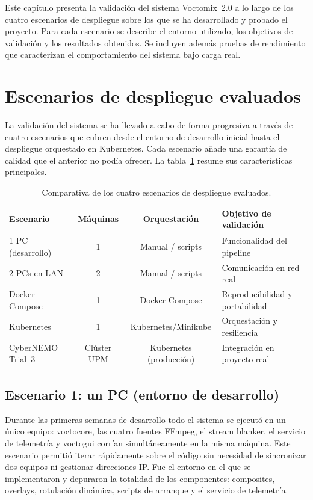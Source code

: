 Este capítulo presenta la validación del sistema Voctomix~2.0 a lo largo de los cuatro
escenarios de despliegue sobre los que se ha desarrollado y probado el proyecto.
Para cada escenario se describe el entorno utilizado, los objetivos de validación y
los resultados obtenidos. Se incluyen además pruebas de rendimiento que caracterizan
el comportamiento del sistema bajo carga real.

\section{Escenarios de despliegue evaluados}
\label{sec:escenarios}

La validación del sistema se ha llevado a cabo de forma progresiva a través de cuatro
escenarios que cubren desde el entorno de desarrollo inicial hasta el despliegue
orquestado en Kubernetes. Cada escenario añade una garantía de calidad que el anterior
no podía ofrecer. La tabla~\ref{tab:escenarios} resume sus características principales.

\begin{table}[H]
  \centering
  \caption{Comparativa de los cuatro escenarios de despliegue evaluados.}
  \label{tab:escenarios}
  \begin{tabular}{|l|c|c|l|}
    \hline
    \textbf{Escenario} & \textbf{Máquinas} & \textbf{Orquestación} & \textbf{Objetivo de validación} \\
    \hline
    1 PC (desarrollo)   & 1 & Manual / scripts    & Funcionalidad del pipeline \\
    2 PCs en LAN        & 2 & Manual / scripts    & Comunicación en red real \\
    Docker Compose      & 1 & Docker Compose      & Reproducibilidad y portabilidad \\
    Kubernetes          & 1 & Kubernetes/Minikube & Orquestación y resiliencia \\
    CyberNEMO Trial~3   & Clúster UPM & Kubernetes (producción) & Integración en proyecto real \\
    \hline
  \end{tabular}
\end{table}

\subsection{Escenario 1: un PC (entorno de desarrollo)}

Durante las primeras semanas de desarrollo todo el sistema se ejecutó en un único
equipo: voctocore, las cuatro fuentes FFmpeg, el stream blanker, el servicio de
telemetría y voctogui corrían simultáneamente en la misma máquina. Este escenario
permitió iterar rápidamente sobre el código sin necesidad de sincronizar dos equipos
ni gestionar direcciones IP. Fue el entorno en el que se implementaron y depuraron
la totalidad de los componentes: composites, overlays, rotulación dinámica, scripts
de arranque y el servicio de telemetría.

